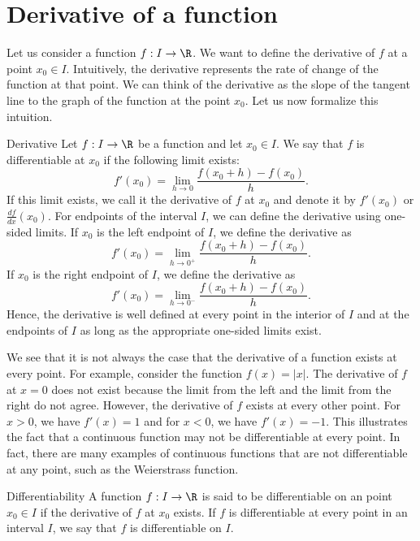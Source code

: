 \documentclass[openany]{book}
\begin{document}
\section{Derivative of a function}
Let us consider a function $f: I \to \R$. We want to define the derivative of $f$ at a point $x_0 \in I$. Intuitively, the derivative represents the rate of change of the function at that point. We can think of the derivative as the slope of the tangent line to the graph of the function at the point $x_0$. Let us now formalize this intuition. 
\begin{mydefinition}{Derivative}
    Let $f: I \to \R$ be a function and let $x_0 \in I$. We say that $f$ is differentiable at $x_0$ if the following limit exists:
    \[
        f'(x_0) = \lim_{h \to 0} \frac{f(x_0 + h) - f(x_0)}{h}.
    \]
    If this limit exists, we call it the derivative of $f$ at $x_0$ and denote it by $f'(x_0)$ or $\frac{df}{dx}(x_0)$.
    For endpoints of the interval $I$, we can define the derivative using one-sided limits. If $x_0$ is the left endpoint of $I$, we define the derivative as
\[
    f'(x_0) = \lim_{h \to 0^+} \frac{f(x_0 + h) - f(x_0)}{h}.
\]
If $x_0$ is the right endpoint of $I$, we define the derivative as
\[
    f'(x_0) = \lim_{h \to 0^-} \frac{f(x_0 + h) - f(x_0)}{h}.
\]
Hence, the derivative is well defined at every point in the interior of $I$ and at the endpoints of $I$ as long as the appropriate one-sided limits exist.
\end{mydefinition}
We see that it is not always the case that the derivative of a function exists at every point. For example, consider the function $f(x) = |x|$. The derivative of $f$ at $x = 0$ does not exist because the limit from the left and the limit from the right do not agree. However, the derivative of $f$ exists at every other point. For $x > 0$, we have $f'(x) = 1$ and for $x < 0$, we have $f'(x) = -1$. This illustrates the fact that a continuous function may not be differentiable at every point. In fact, there are many examples of continuous functions that are not differentiable at any point, such as the Weierstrass function.
\begin{mydefinition}{Differentiability}
    A function $f: I \to \R$ is said to be differentiable on an point $x_0 \in I$ if the derivative of $f$ at $x_0$ exists. If $f$ is differentiable at every point in an interval $I$, we say that $f$ is differentiable on $I$.
\end{mydefinition}
\end{document}
